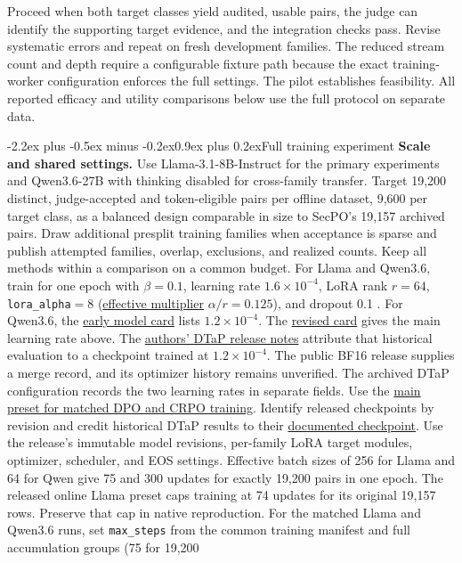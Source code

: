 \documentclass[11pt]{article}
\makeatletter
\renewcommand\section{\@startsection{section}{1}{\z@}%
  {-2.2ex plus -0.5ex minus -0.2ex}{0.9ex plus 0.2ex}{\normalfont\Large\bfseries}}
\makeatother
\begin{document}
Proceed when both target classes yield audited, usable pairs, the judge can identify the supporting target evidence, and the integration checks pass. Revise systematic errors and repeat on fresh development families. The reduced stream count and depth require a configurable fixture path because the exact training-worker configuration enforces the full settings. The pilot establishes feasibility. All reported efficacy and utility comparisons below use the full protocol on separate data.

\section{Full training experiment}
\textbf{Scale and shared settings.} Use Llama-3.1-8B-Instruct for the primary experiments and Qwen3.6-27B with thinking disabled for cross-family transfer. Target 19,200 distinct, judge-accepted and token-eligible pairs per offline dataset, 9,600 per target class, as a balanced design comparable in size to SecPO's 19,157 archived pairs. Draw additional presplit training families when acceptance is sparse and publish attempted families, overlap, exclusions, and realized counts. Keep all methods within a comparison on a common budget. For Llama and Qwen3.6, train for one epoch with $\beta=0.1$, learning rate $1.6\times10^{-4}$, LoRA rank $r=64$, \texttt{lora\_alpha}$=8$ (\href{https://github.com/huggingface/peft/blob/v0.19.1/src/peft/tuners/lora/layer.py#L215}{effective multiplier} $\alpha/r=0.125$), and dropout 0.1 \cite[Sec.~4.1 and App.~B.1]{chen2026secpo}. For Qwen3.6, the \href{https://huggingface.co/Sizhe-Chen/Qwen3.6-27B-Instruct-SecPO/blob/28c89b1e4c28aa47cd048f9c0f7616ad636cf028/README.md}{early model card} lists $1.2\times10^{-4}$. The \href{https://huggingface.co/Sizhe-Chen/Qwen3.6-27B-Instruct-SecPO/blob/ee6434402a42b9daf81db1bdbb8b0d1a70960d1b/README.md}{revised card} gives the main learning rate above. The \href{https://github.com/Sizhe-Chen/SecPO/blob/da0372a0e598badf4e51c98c175a962147cac2ac/docs/DTAP.md#L54-L57}{authors' DTaP release notes} attribute that historical evaluation to a checkpoint trained at $1.2\times10^{-4}$. The public BF16 release supplies a merge record, and its optimizer history remains unverified. The archived DTaP configuration records the two learning rates in separate fields. Use the \href{https://github.com/Sizhe-Chen/SecPO/blob/da0372a0e598badf4e51c98c175a962147cac2ac/configs/train_qwen36_27b_offline.json}{main preset for matched DPO and CRPO training}. Identify released checkpoints by revision and credit historical DTaP results to their \href{https://github.com/Sizhe-Chen/SecPO/blob/da0372a0e598badf4e51c98c175a962147cac2ac/configs/evaluate_dtap_qwen36_27b.json#L23-L26}{documented checkpoint}. Use the release's immutable model revisions, per-family LoRA target modules, optimizer, scheduler, and EOS settings. Effective batch sizes of 256 for Llama and 64 for Qwen give 75 and 300 updates for exactly 19,200 pairs in one epoch. The released online Llama preset caps training at 74 updates for its original 19,157 rows. Preserve that cap in native reproduction. For the matched Llama and Qwen3.6 runs, set \texttt{max\_steps} from the common training manifest and full accumulation groups (75 for 19,200 
\end{document}
